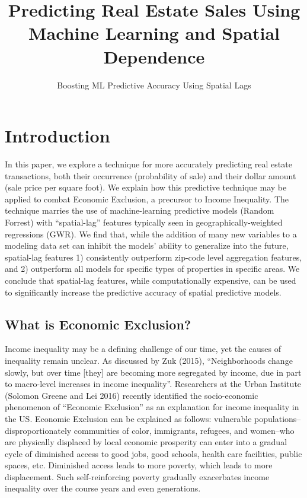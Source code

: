 \documentclass[]{article}
\title{Predicting Real Estate Sales Using Machine Learning and Spatial
Dependence}
\subtitle{Boosting ML Predictive Accuracy Using Spatial Lags}
\author{}
\date{}
\begin{document}
\maketitle

{
\setcounter{tocdepth}{2}
\tableofcontents
}
\section{Introduction}\label{introduction}

In this paper, we explore a technique for more accurately predicting
real estate transactions, both their occurrence (probability of sale)
and their dollar amount (sale price per square foot). We explain how
this predictive technique may be applied to combat Economic Exclusion, a
precursor to Income Inequality. The technique marries the use of
machine-learning predictive models (Random Forrest) with ``spatial-lag''
features typically seen in geographically-weighted regressions (GWR). We
find that, while the addition of many new variables to a modeling data
set can inhibit the models' ability to generalize into the future,
spatial-lag features 1) consistently outperform zip-code level
aggregation features, and 2) outperform all models for specific types of
properties in specific areas. We conclude that spatial-lag features,
while computationally expensive, can be used to significantly increase
the predictive accuracy of spatial predictive models.

\subsection{What is Economic
Exclusion?}\label{what-is-economic-exclusion}

Income inequality may be a defining challenge of our time, yet the
causes of inequality remain unclear. As discussed by Zuk (2015),
``Neighborhoods change slowly, but over time {[}they{]} are becoming
more segregated by income, due in part to macro-level increases in
income inequality''. Researchers at the Urban Institute (Solomon Greene
and Lei 2016) recently identified the socio-economic phenomenon of
``Economic Exclusion'' as an explanation for income inequality in the
US. Economic Exclusion can be explained as follows: vulnerable
populations--disproportionately communities of color, immigrants,
refugees, and women--who are physically displaced by local economic
prosperity can enter into a gradual cycle of diminished access to good
jobs, good schools, health care facilities, public spaces, etc.
Diminished access leads to more poverty, which leads to more
displacement. Such self-reinforcing poverty gradually exacerbates income
inequality over the course years and even generations.
\end{document}

